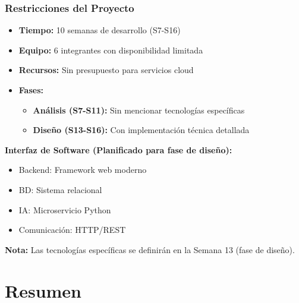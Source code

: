 \documentclass[aspectratio=169]{beamer}
\begin{document}
\begin{frame}
\frametitle{Restricciones del Proyecto}

\begin{itemize}
\item \textbf{Tiempo:} 10 semanas de desarrollo (S7-S16)
\item \textbf{Equipo:} 6 integrantes con disponibilidad limitada
\item \textbf{Recursos:} Sin presupuesto para servicios cloud
\item \textbf{Fases:}
  \begin{itemize}
  \item \textbf{Análisis (S7-S11):} Sin mencionar tecnologías específicas
  \item \textbf{Diseño (S13-S16):} Con implementación técnica detallada
  \end{itemize}
\end{itemize}

\vspace{0.3cm}

\begin{tcolorbox}[colback=red!5, colframe=red!50]
\textbf{Interfaz de Software (Planificado para fase de diseño):}
\begin{itemize}
\item Backend: Framework web moderno
\item BD: Sistema relacional
\item IA: Microservicio Python
\item Comunicación: HTTP/REST
\end{itemize}
\end{tcolorbox}

\textbf{Nota:} Las tecnologías específicas se definirán en la Semana 13 (fase de diseño).

\end{frame}

\section{Resumen}
\end{document}

